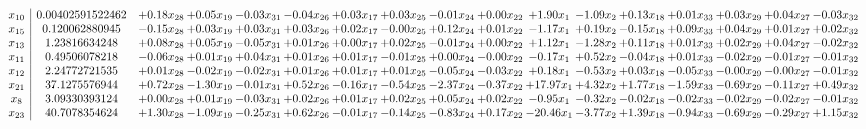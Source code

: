 \documentclass[9pt]{article}
\begin{document}
 \[\begin{array}{c| c c@{\hskip 2pt} c@{\hskip 2pt} c@{\hskip 2pt} c@{\hskip 2pt} c@{\hskip 2pt} c@{\hskip 2pt} c@{\hskip 2pt} c@{\hskip 2pt} c@{\hskip 2pt} c@{\hskip 2pt} c@{\hskip 2pt} c@{\hskip 2pt} c@{\hskip 2pt} c@{\hskip 2pt} c@{\hskip 2pt} }
 x_{10}   &  0.00402591522462 & +  0.18 x_{28} & +  0.05 x_{19} & -0.03 x_{31} & -0.04 x_{26} & +  0.03 x_{17} & +  0.03 x_{25} & -0.01 x_{24} & +  0.00 x_{22} & +  1.90 x_{1} & -1.09 x_{2} & +  0.13 x_{18} & +  0.01 x_{33} & +  0.03 x_{29} & +  0.04 x_{27} & -0.03 x_{32}\\
 x_{15}   &  0.120062880945 & -0.15 x_{28} & +  0.03 x_{19} & +  0.03 x_{31} & +  0.03 x_{26} & +  0.02 x_{17} & -0.00 x_{25} & +  0.12 x_{24} & +  0.01 x_{22} & -1.17 x_{1} & +  0.19 x_{2} & -0.15 x_{18} & +  0.09 x_{33} & +  0.04 x_{29} & +  0.01 x_{27} & +  0.02 x_{32}\\
 x_{13}   &  1.23816634248 & +  0.08 x_{28} & +  0.05 x_{19} & -0.05 x_{31} & +  0.01 x_{26} & +  0.00 x_{17} & +  0.02 x_{25} & -0.01 x_{24} & +  0.00 x_{22} & +  1.12 x_{1} & -1.28 x_{2} & +  0.11 x_{18} & +  0.01 x_{33} & +  0.02 x_{29} & +  0.04 x_{27} & -0.02 x_{32}\\
 x_{11}   &  0.49506078218 & -0.06 x_{28} & +  0.01 x_{19} & +  0.04 x_{31} & +  0.01 x_{26} & +  0.01 x_{17} & -0.01 x_{25} & +  0.00 x_{24} & -0.00 x_{22} & -0.17 x_{1} & +  0.52 x_{2} & -0.04 x_{18} & +  0.01 x_{33} & -0.02 x_{29} & -0.01 x_{27} & -0.01 x_{32}\\
 x_{12}   &  2.24772721535 & +  0.01 x_{28} & -0.02 x_{19} & -0.02 x_{31} & +  0.01 x_{26} & +  0.01 x_{17} & +  0.01 x_{25} & -0.05 x_{24} & -0.03 x_{22} & +  0.18 x_{1} & -0.53 x_{2} & +  0.03 x_{18} & -0.05 x_{33} & -0.00 x_{29} & -0.00 x_{27} & -0.01 x_{32}\\
 x_{21}   &  37.1275576944 & +  0.72 x_{28} & -1.30 x_{19} & -0.01 x_{31} & +  0.52 x_{26} & -0.16 x_{17} & -0.54 x_{25} & -2.37 x_{24} & -0.37 x_{22} & + 17.97 x_{1} & +  4.32 x_{2} & +  1.77 x_{18} & -1.59 x_{33} & -0.69 x_{29} & -0.11 x_{27} & +  0.49 x_{32}\\
 x_{8}   &  3.09330393124 & +  0.00 x_{28} & +  0.01 x_{19} & -0.03 x_{31} & +  0.02 x_{26} & +  0.01 x_{17} & +  0.02 x_{25} & +  0.05 x_{24} & +  0.02 x_{22} & -0.95 x_{1} & -0.32 x_{2} & -0.02 x_{18} & -0.02 x_{33} & -0.02 x_{29} & -0.02 x_{27} & -0.01 x_{32}\\
 x_{23}   &  40.7078354624 & +  1.30 x_{28} & -1.09 x_{19} & -0.25 x_{31} & +  0.62 x_{26} & -0.01 x_{17} & -0.14 x_{25} & -0.83 x_{24} & +  0.17 x_{22} & -20.46 x_{1} & -3.77 x_{2} & +  1.39 x_{18} & -0.94 x_{33} & -0.69 x_{29} & -0.29 x_{27} & +  1.15 x_{32}\\

\end{array}\]
\end{document}
